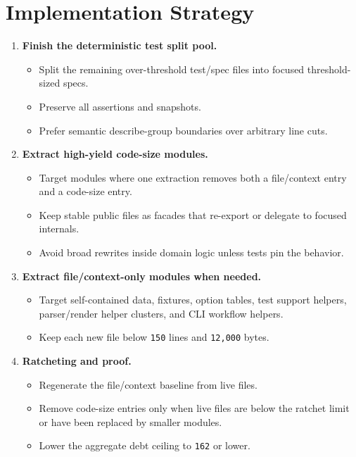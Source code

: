\section{Implementation Strategy}\label{record-244-implementation-strategy}

\begin{enumerate}
\def\labelenumi{\arabic{enumi}.}
\tightlist
\item
  \textbf{Finish the deterministic test split pool.}

  \begin{itemize}
  \tightlist
  \item
    Split the remaining over-threshold test/spec files into focused threshold-sized specs.
  \item
    Preserve all assertions and snapshots.
  \item
    Prefer semantic describe-group boundaries over arbitrary line cuts.
  \end{itemize}
\item
  \textbf{Extract high-yield code-size modules.}

  \begin{itemize}
  \tightlist
  \item
    Target modules where one extraction removes both a file/context entry and a code-size entry.
  \item
    Keep stable public files as facades that re-export or delegate to focused internals.
  \item
    Avoid broad rewrites inside domain logic unless tests pin the behavior.
  \end{itemize}
\item
  \textbf{Extract file/context-only modules when needed.}

  \begin{itemize}
  \tightlist
  \item
    Target self-contained data, fixtures, option tables, test support helpers, parser/render helper clusters, and CLI workflow helpers.
  \item
    Keep each new file below \texttt{1\allowbreak{}5\allowbreak{}0} lines and \texttt{1\allowbreak{}2\allowbreak{},\allowbreak{}0\allowbreak{}0\allowbreak{}0} bytes.
  \end{itemize}
\item
  \textbf{Ratcheting and proof.}

  \begin{itemize}
  \tightlist
  \item
    Regenerate the file/context baseline from live files.
  \item
    Remove code-size entries only when live files are below the ratchet limit or have been replaced by smaller modules.
  \item
    Lower the aggregate debt ceiling to \texttt{1\allowbreak{}6\allowbreak{}2} or lower.
  \end{itemize}
\end{enumerate}

